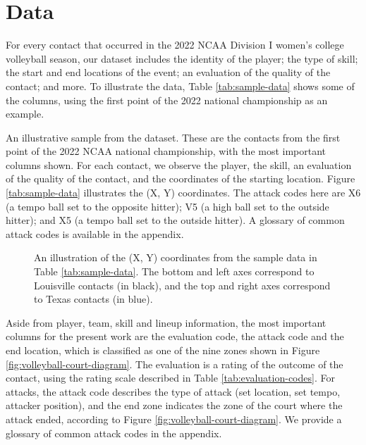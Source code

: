 \documentclass[USenglish]{article}
\theoremstyle{dgthm}
\theoremstyle{dgdef}
\begin{document}
\section{Data}
\label{sec:data}

For every contact that occurred in the 2022 NCAA Division I women's college volleyball season, our dataset includes the identity of the player; the type of skill; the start and end locations of the event; an evaluation of the quality of the contact; and more.  To illustrate the data, Table \ref{tab:sample-data} shows some of the columns, using the first point of the 2022 national championship as an example.

\begin{table}
    \centering
    
    \caption{
      An illustrative sample from the dataset. These are the contacts from the first point of the 2022 NCAA national championship, with the most important columns shown. For each contact, we observe the player, the skill, an evaluation of the quality of the contact, and the coordinates of the starting location. Figure \ref{tab:sample-data} illustrates the (X, Y) coordinates. The attack codes here are X6 (a tempo ball set to the opposite hitter); V5 (a high ball set to the outside hitter); and X5 (a tempo ball set to the outside hitter). A glossary of common attack codes is available in the appendix.
    }
    \label{tab:sample-data}
\end{table}

\begin{figure}
    \centering
    \caption{
      An illustration of the (X, Y) coordinates from the sample data in Table \ref{tab:sample-data}. The bottom and left axes correspond to Louisville contacts (in black), and the top and right axes correspond to Texas contacts (in blue).
    }
    \label{fig:sample-data}
\end{figure}

Aside from player, team, skill and lineup information, the most important columns for the present work are the evaluation code, the attack code and the end location, which is classified as one of the nine zones shown in Figure \ref{fig:volleyball-court-diagram}. The evaluation is a rating of the outcome of the contact, using the rating scale described in Table \ref{tab:evaluation-codes}. For attacks, the attack code describes the type of attack (set location, set tempo, attacker position), and the end zone indicates the zone of the court where the attack ended, according to Figure \ref{fig:volleyball-court-diagram}. We provide a glossary of common attack codes in the appendix.
\end{document}

